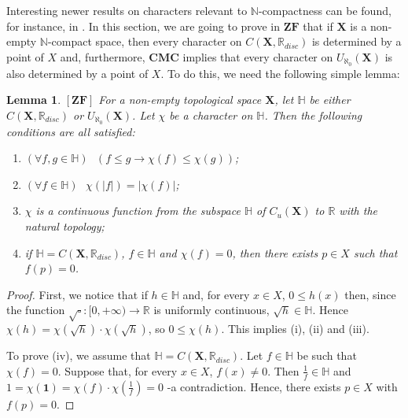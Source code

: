 \documentclass[12pt,twoside,leqno]{article}
\theoremstyle{plain}
\newtheorem{lemma}[theorem]{Lemma}
\theoremstyle{definition}
\theoremstyle{remark}
\begin{document}
Interesting newer results on characters relevant to $\mathbb{N}$-compactness can be found, for instance, in \cite{ol}. In this section, we are going to prove in $\mathbf{ZF}$ that if $\mathbf{X}$ is a non-empty $\mathbb{N}$-compact space, then every character on $C(\mathbf{X}, \mathbb{R}_{disc})$ is determined by a point of $X$ and, furthermore, $\mathbf{CMC}$ implies that every character on $U_{\aleph_0}(\mathbf{X})$ is also determined by a point of $X$. To do this, we need the following simple lemma:

\begin{lemma}
	\label{s9:l3}
	$[\mathbf{ZF}]$ For a non-empty topological space $\mathbf{X}$, let $\mathbb{H}$ be either $C(\mathbf{X}, \mathbb{R}_{disc})$ or $U_{\aleph_0}(\mathbf{X})$. Let $\chi$ be a character on $\mathbb{H}$. Then the following conditions are all satisfied:
	\begin{enumerate}
		\item[(i)] $(\forall f, g\in\mathbb{H})\text{ } (f\leq g\rightarrow \chi(f)\leq\chi(g))$;
		\item[(ii)] $(\forall f\in\mathbb{H})\text{ } \chi(|f|)=|\chi(f)|$;
		\item[(iii)] $\chi$ is a continuous function from the subspace $\mathbb{H}$ of $C_{u}(\mathbf{X})$ to $\mathbb{R}$ with the natural topology;
		\item[(iv)] if $\mathbb{H}=C(\mathbf{X}, \mathbb{R}_{disc})$, $f\in \mathbb{H}$ and $\chi(f)=0$, then there exists $p\in X$ such that $f(p)=0$.
	\end{enumerate}
\end{lemma}
\begin{proof}
	First, we notice that if $h\in \mathbb{H}$ and, for every $x\in X$, $0\leq h(x)$ then, since the function $\sqrt\square:[0,+\infty)\to\mathbb{R}$ is uniformly continuous, $\sqrt h\in\mathbb{H}$. Hence $\chi(h)=\chi(\sqrt h)\cdot\chi(\sqrt h)$, so $0\leq\chi(h)$. This implies (i), (ii) and (iii). 
	
	To prove (iv), we assume that $\mathbb{H}=C(\mathbf{X}, \mathbb{R}_{disc})$. Let $f\in\mathbb{H}$ be such that $\chi(f)=0$. Suppose that, for every $x\in X$, $f(x)\neq 0$. Then $\frac{1}{f}\in\mathbb{H}$ and $1=\chi(\mathbf{1})=\chi(f)\cdot\chi(\frac{1}{f})=0$ -a contradiction. Hence, there exists $p\in X$ with $f(p)=0$. 
\end{proof}
\end{document}
